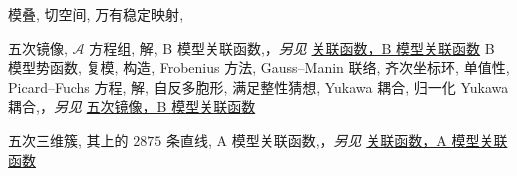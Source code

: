 \begin{theindex}
\subsubitem \leavevmode\hypertarget{idx:1280}{模叠},\enspace{}
\subsubitem \leavevmode\hypertarget{idx:1281}{切空间},\enspace{}
\subitem \leavevmode\hypertarget{idx:1282}{万有稳定映射},\enspace{}
\indexspace
\item \leavevmode\hypertarget{idx:1164}{五次镜像},\enspace{}
\subitem \leavevmode\hypertarget{idx:1165}{$\mathcal A$ 方程组},\enspace{}
\subsubitem \leavevmode\hypertarget{idx:1166}{解},\enspace{}
\subitem \leavevmode\hypertarget{idx:1167}{B 模型关联函数},\enspace{}，\textit{另见} \hyperlink{idx:0189}{关联函数，B 模型关联函数}
\subitem \leavevmode\hypertarget{idx:1168}{B 模型势函数},\enspace{}
\subitem \leavevmode\hypertarget{idx:1169}{复模},\enspace{}
\subitem \leavevmode\hypertarget{idx:1170}{构造},\enspace{}
\subitem \leavevmode\hypertarget{idx:1171}{Frobenius 方法},\enspace{}
\subitem \leavevmode\hypertarget{idx:1172}{Gauss--Manin 联络},\enspace{}
\subitem \leavevmode\hypertarget{idx:1173}{齐次坐标环},\enspace{}
\subitem \leavevmode\hypertarget{idx:1174}{单值性},\enspace{}
\subitem \leavevmode\hypertarget{idx:1175}{Picard--Fuchs 方程},\enspace{}
\subsubitem \leavevmode\hypertarget{idx:1176}{解},\enspace{}
\subitem \leavevmode\hypertarget{idx:1177}{自反多胞形},\enspace{}
\subitem \leavevmode\hypertarget{idx:1178}{满足整性猜想},\enspace{}
\subitem \leavevmode\hypertarget{idx:1179}{Yukawa 耦合},\enspace{}
\subsubitem \leavevmode\hypertarget{idx:1180}{归一化 Yukawa 耦合},\enspace{}，\textit{另见} \hyperlink{idx:1167}{五次镜像，B 模型关联函数}
\indexspace
\item \leavevmode\hypertarget{idx:1181}{五次三维簇},\enspace{}
\subitem \leavevmode\hypertarget{idx:1182}{其上的 $2875$ 条直线},\enspace{}
\subitem \leavevmode\hypertarget{idx:1183}{A 模型关联函数},\enspace{}，\textit{另见} \hyperlink{idx:0184}{关联函数，A 模型关联函数}

\end{theindex}
